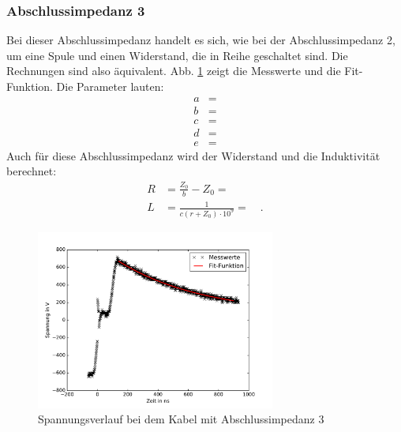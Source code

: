 \subsubsection{Abschlussimpedanz 3}
Bei dieser Abschlussimpedanz handelt es sich, wie bei der Abschlussimpedanz 2, um eine Spule und einen Widerstand, die in Reihe geschaltet sind. Die Rechnungen sind also äquivalent. Abb. \ref{fig:box28} zeigt die Messwerte und die Fit-Funktion. Die Parameter lauten:
\begin{align}
	a &=  \\
	b &=  \\
	c &=  \\
	d &=  \\
	e &=  
\end{align}
Auch für diese Abschlussimpedanz wird der Widerstand und die Induktivität berechnet:
\begin{align}
	R &= \frac{Z_0}{b} - Z_0 =  \\
	L &= \frac{1}{ c (r + Z_0) \cdot 10^9} =  \quad.
\end{align}

\begin{figure}
	\centering
	\includegraphics[width=0.7\textwidth]{Box28/Box28.pdf}
	\caption{Spannungsverlauf bei dem Kabel mit Abschlussimpedanz 3}
	\label{fig:box28}
\end{figure}

